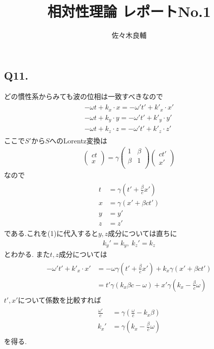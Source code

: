 \documentclass[uplatex,a4j,11pt,dvipdfmx]{jsarticle}
\begin{document}
\title{相対性理論 レポートNo.1}
\author{佐々木良輔}
\date{}
\maketitle
\subsection*{Q11.}
どの慣性系からみても波の位相は一致すべきなので
\begin{align}
  \begin{split}
    -\omega t+k_x\cdot x=-\omega' t'+k'_x\cdot x'\\
    -\omega t+k_y\cdot y=-\omega' t'+k'_y\cdot y'\\
    -\omega t+k_z\cdot z=-\omega' t'+k'_z\cdot z'
  \end{split}
\end{align}
ここで$S'$から$S$へのLorentz変換は
\begin{align*}
  \left(\begin{array}{c}
    ct\\x
  \end{array}\right)
  =\gamma\left(\begin{array}{cc}
    1 & \beta\\
    \beta & 1\\
  \end{array}\right)\left(
    \begin{array}{c}
      ct'\\x'
    \end{array}
  \right)
\end{align*}
なので
\begin{align}
  \begin{split}
    t&=\gamma\left(t'+\frac{\beta}{c}x'\right)\\
    x&=\gamma\left(x'+\beta ct'\right)\\
    y&=y'\\
    z&=z'
  \end{split}
\end{align}
である.これを(1)に代入すると$y,z$成分については直ちに
\begin{align*}
  k_y'=k_y,\ k_z'=k_z
\end{align*}
とわかる.
また$t,z$成分については
\begin{align}
  \begin{split}
    -\omega' t'+k'_x\cdot x'&=-\omega\gamma\left(t'+\frac{\beta}{c}x'\right)+k_x\gamma\left(x'+\beta ct'\right)\\
    &=t'\gamma\left(k_x\beta c-\omega\right)+x'\gamma\left(k_x-\frac{\beta}{c}\omega\right)
  \end{split}
\end{align}
$t',x'$について係数を比較すれば
\begin{align}
  \begin{split}
    \frac{\omega'}{c}&=\gamma\left(\frac{\omega}{c}-k_x\beta\right)\\
    k_x'&=\gamma\left(k_x-\frac{\beta}{c}\omega\right)
  \end{split}
\end{align}
を得る.
\end{document}
